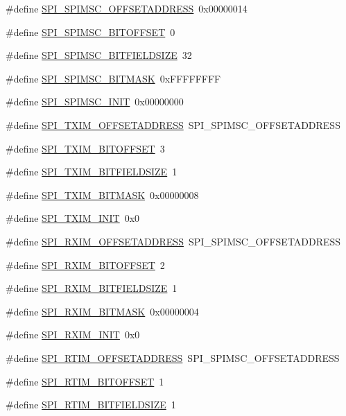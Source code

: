 \begin{DoxyCompactItemize}
\#define \hyperlink{a00573_a18b229ab4c2e569746670650be4cf72a}{SPI\_\-SPIMSC\_\-OFFSETADDRESS}~0x00000014
\item 
\#define \hyperlink{a00573_ad251acb591ab595a7e8ba50da83394bf}{SPI\_\-SPIMSC\_\-BITOFFSET}~0
\item 
\#define \hyperlink{a00573_a7620e344b82fff7dd11e3c08ef9eed9a}{SPI\_\-SPIMSC\_\-BITFIELDSIZE}~32
\item 
\#define \hyperlink{a00573_a5106adffe460f2f6e0ec5f85f7893454}{SPI\_\-SPIMSC\_\-BITMASK}~0xFFFFFFFF
\item 
\#define \hyperlink{a00573_af10e91d323a47ea13abc64af035691ac}{SPI\_\-SPIMSC\_\-INIT}~0x00000000
\item 
\#define \hyperlink{a00573_a4e93dd5a3f94cbdf23bc375c9e3676fd}{SPI\_\-TXIM\_\-OFFSETADDRESS}~SPI\_\-SPIMSC\_\-OFFSETADDRESS
\item 
\#define \hyperlink{a00573_adf4b224361b5c4229b61a2ae0568c637}{SPI\_\-TXIM\_\-BITOFFSET}~3
\item 
\#define \hyperlink{a00573_a73eb5dab3c6ab4f2455672f59935322c}{SPI\_\-TXIM\_\-BITFIELDSIZE}~1
\item 
\#define \hyperlink{a00573_a56b039c34622fe50892014688d6bc8b7}{SPI\_\-TXIM\_\-BITMASK}~0x00000008
\item 
\#define \hyperlink{a00573_a2a0cd61805c483762171647939f87d1d}{SPI\_\-TXIM\_\-INIT}~0x0
\item 
\#define \hyperlink{a00573_a7247b90c01473a83bcb870f788b20428}{SPI\_\-RXIM\_\-OFFSETADDRESS}~SPI\_\-SPIMSC\_\-OFFSETADDRESS
\item 
\#define \hyperlink{a00573_a2438f86c5b0aae511656af7fe0954d09}{SPI\_\-RXIM\_\-BITOFFSET}~2
\item 
\#define \hyperlink{a00573_a0d0458bc756d44abf421f862a30dfbc0}{SPI\_\-RXIM\_\-BITFIELDSIZE}~1
\item 
\#define \hyperlink{a00573_abf50f598d6e33ead7b7cdfdb129126c6}{SPI\_\-RXIM\_\-BITMASK}~0x00000004
\item 
\#define \hyperlink{a00573_af1dfc6d82796f4c6362c43c744463fb3}{SPI\_\-RXIM\_\-INIT}~0x0
\item 
\#define \hyperlink{a00573_a4deec936b62e0546923d51a33a47ce31}{SPI\_\-RTIM\_\-OFFSETADDRESS}~SPI\_\-SPIMSC\_\-OFFSETADDRESS
\item 
\#define \hyperlink{a00573_a7f4d8d63d09526adbda13a3bf76a10ec}{SPI\_\-RTIM\_\-BITOFFSET}~1
\item 
\#define \hyperlink{a00573_adfad177bc729a0975fdb631ae02af240}{SPI\_\-RTIM\_\-BITFIELDSIZE}~1
\item 

\end{DoxyCompactItemize}
